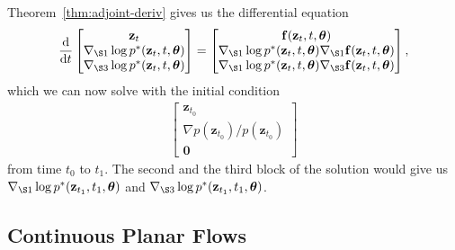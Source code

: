 \documentclass[10pt]{article}
\newcommand{\dee}{\mathrm{d}}
\newcommand{\ve}[1]{\mathbf{#1}}
\newcommand{\ves}[1]{\boldsymbol{#1}}
\begin{document}
\begin{itemize}
  Theorem~\ref{thm:adjoint-deriv} gives us the differential equation
  \begin{align*}
    \frac{\dee}{\dee t} \begin{bmatrix}
      \ve{z}_t \\
      \nabla_{\S1} \log p^*(\ve{z}_t, t, \ves{\theta}) \\
      \nabla_{\S3} \log p^*(\ve{z}_t, t, \ves{\theta})
    \end{bmatrix}
    = \begin{bmatrix}
      \ve{f}(\ve{z}_t, t, \ves{\theta}) \\
      \nabla_{\S1} \log p^*(\ve{z}_t, t, \ves{\theta}) \nabla_{\S1} \ve{f}(\ve{z}_t, t, \ves{\theta}) \\
      \nabla_{\S1} \log p^*(\ve{z}_t, t, \ves{\theta}) \nabla_{\S3} \ve{f}(\ve{z}_t, t, \ves{\theta})
    \end{bmatrix},
  \end{align*}  
  which we can now solve with the initial condition
  \begin{align*}
    \begin{bmatrix}
      \ve{z}_{t_0} \\
      \nabla p(\ve{z}_{t_0}) / p(\ve{z}_{t_0}) \\
      \ve{0}
    \end{bmatrix}
  \end{align*}
  from time $t_0$ to $t_1$. The second and the third block of the solution would give us $\nabla_{\S1} \log p^*(\ve{z}_{t_1}, t_1, \ves{\theta})$ and $\nabla_{\S3} \log p^*(\ve{z}_{t_1}, t_1, \ves{\theta})$.
\end{itemize}

\subsection{Continuous Planar Flows}
\end{document}
